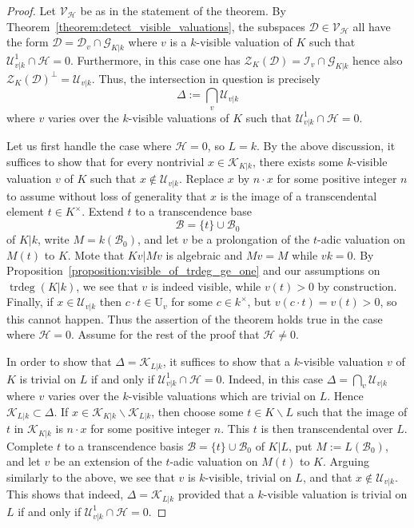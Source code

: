 \documentclass[12pt]{amsart}
\newcommand{\smin}{\smallsetminus}
\newcommand{\trdeg}{\operatorname{trdeg}}
\newcommand{\Urm}{\mathrm{U}}
\newcommand{\Bcal}{\mathcal{B}}
\newcommand{\Vscr}{\mathscr{V}}
\newcommand{\Zcal}{\mathcal{Z}}
\newcommand{\Gcal}{\mathcal{G}}
\newcommand{\Dcal}{\mathcal{D}}
\newcommand{\Ical}{\mathcal{I}}
\newcommand{\Hcal}{\mathcal{H}}
\newcommand{\Ucal}{\mathcal{U}}
\newcommand{\Kcal}{\mathcal{K}}
\theoremstyle{definition}
\begin{document}
\begin{proof}
  Let $\Vscr_{\Hcal}$ be as in the statement of the theorem.
  By Theorem~\ref{theorem:detect_visible_valuations}, the subspaces $\Dcal \in \Vscr_{\Hcal}$ all have the form $\Dcal = \Dcal_{v} \cap \Gcal_{K|k}$ where $v$ is a $k$-visible valuation of $K$ such that $\Ucal_{v|k}^{1} \cap \Hcal = 0$.
  Furthermore, in this case one has $\Zcal_{K}(\Dcal) = \Ical_{v} \cap \Gcal_{K|k}$ hence also $\Zcal_{K}(\Dcal)^{\perp} = \Ucal_{v|k}$.
  Thus, the intersection in question is precisely 
  \[ \Delta := \bigcap_{v} \Ucal_{v|k} \]
  where $v$ varies over the $k$-visible valuations of $K$ such that $\Ucal_{v|k}^{1} \cap \Hcal = 0$.

  Let us first handle the case where $\Hcal = 0$, so $L = k$.
  By the above discussion, it suffices to show that for every nontrivial $x \in \Kcal_{K|k}$, there exists some $k$-visible valuation $v$ of $K$ such that $x \notin \Ucal_{v|k}$.
  Replace $x$ by $n \cdot x$ for some positive integer $n$ to assume without loss of generality that $x$ is the image of a transcendental element $t \in K^{\times}$.
  Extend $t$ to a transcendence base
  \[ \Bcal = \{t\} \cup \Bcal_{0} \]
  of $K|k$, write $M = k(\Bcal_{0})$, and let $v$ be a prolongation of the $t$-adic valuation on $M(t)$ to $K$.
  Mote that $Kv|Mv$ is algebraic and $Mv = M$ while $vk = 0$.
  By Proposition~\ref{proposition:visible_of_trdeg_ge_one} and our assumptions on $\trdeg(K|k)$, we see that $v$ is indeed visible, while $v(t) > 0$ by construction.
  Finally, if $x \in \Ucal_{v|k}$ then $c \cdot t \in \Urm_{v}$ for some $c \in k^{\times}$, but $v(c \cdot t) = v(t) > 0$, so this cannot happen.
  Thus the assertion of the theorem holds true in the case where $\Hcal = 0$.
  Assume for the rest of the proof that $\Hcal \neq 0$.

  In order to show that $\Delta = \Kcal_{L|k}$, it suffices to show that a $k$-visible valuation $v$ of $K$ is trivial on $L$ if and only if $\Ucal_{v|k}^{1} \cap \Hcal = 0$.
  Indeed, in this case $\Delta = \bigcap_{v} \Ucal_{v|k}$ where $v$ varies over the $k$-visible valuations which are trivial on $L$.
  Hence $\Kcal_{L|k} \subset \Delta$.
  If $x \in \Kcal_{K|k} \smin \Kcal_{L|k}$, then choose some $t \in K \smin L$ such that the image of $t$ in $\Kcal_{K|k}$ is $n \cdot x$ for some positive integer $n$.
  This $t$ is then transcendental over $L$.
  Complete $t$ to a transcendence basis $\Bcal = \{t\} \cup \Bcal_{0}$ of $K|L$, put $M := L(\Bcal_{0})$, and let $v$ be an extension of the $t$-adic valuation on $M(t)$ to $K$.
  Arguing similarly to the above, we see that $v$ is $k$-visible, trivial on $L$, and that $x \notin \Ucal_{v|k}$.
  This shows that indeed, $\Delta = \Kcal_{L|k}$ provided that a $k$-visible valuation is trivial on $L$ if and only if $\Ucal_{v|k}^{1} \cap \Hcal = 0$.


\end{proof}
\end{document}
